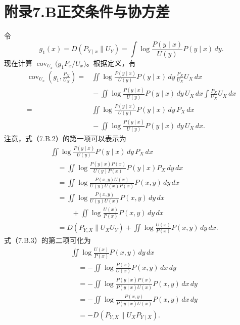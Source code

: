 \section*{附录7.B\quad 正交条件与协方差}

令
\begin{equation}
g_1(x)=D(P_{Y\mid x}\parallel U_Y)
 =\int\log\frac{P(y\mid x)}{U(y)}P(y\mid x)\,dy.\tag{7.B.1}
\end{equation}
现在计算 $\operatorname{cov}_{U_x}\bigl(g_1P_x/U_x\bigr)$。根据定义，有
\begin{equation}
\begin{aligned}
\operatorname{cov}_{U_x}\left(g_1,\frac{P_X}{U_X}\right)
={}&\iint\log\frac{P(y\mid x)}{U(y)}P(y\mid x)\,dy\,
 \frac{P_X}{U_X}U_X\,dx\\
&{}-\iint\log\frac{P(y\mid x)}{U(y)}P(y\mid x)\,dy\,U_X\,dx
 \int\frac{P_X}{U_X}U_X\,dx\\
={}&\iint\log\frac{P(y\mid x)}{U(y)}P(y\mid x)\,dy\,P_X\,dx\\
&{}-\iint\log\frac{P(y\mid x)}{U(y)}P(y\mid x)\,dy\,U_X\,dx.
\end{aligned}\tag{7.B.2}
\end{equation}
注意，式（7.B.2）的第一项可以表示为
\begin{equation}
\begin{aligned}
&\iint\log\frac{P(y\mid x)}{U(y)}P(y\mid x)\,dy\,P_X\,dx\\
&\quad=\iint\log\frac{P(y\mid x)P(x)}{U(y)P(x)}P(y\mid x)P_X\,dy\,dx\\
&\quad=\iint\log\frac{P(x,y)U(x)}{U(y)U(x)P(x)}P(x,y)\,dy\,dx\\
&\quad=\iint\log\frac{P(x,y)}{U(y)U(x)}P(x,y)\,dy\,dx\\
&\qquad\quad{}+\iint\log\frac{U(x)}{P(x)}P(x,y)\,dy\,dx\\
&\quad=D(P_{Y,X}\parallel U_XU_Y)
 +\iint\log\frac{U(x)}{P(x)}P(x,y)\,dy\,dx.
\end{aligned}\tag{7.B.3}
\end{equation}
式（7.B.3）的第二项可化为
\begin{equation}
\begin{aligned}
&\iint\log\frac{U(x)}{P(x)}P(x,y)\,dy\,dx\\
&\quad=-\iint\log\frac{P(x)}{U(x)}P(x,y)\,dx\,dy\\
&\quad=-\iint\log\frac{P(y\mid x)P(x)}{P(y\mid x)U(x)}P(x,y)\,dx\,dy\\
&\quad=-\iint\log\frac{P(x,y)}{P(y\mid x)U(x)}P(x,y)\,dx\,dy\\
&\quad=-D(P_{Y,X}\parallel U_XP_{Y\mid X}).
\end{aligned}\tag{7.B.4}
\end{equation}
